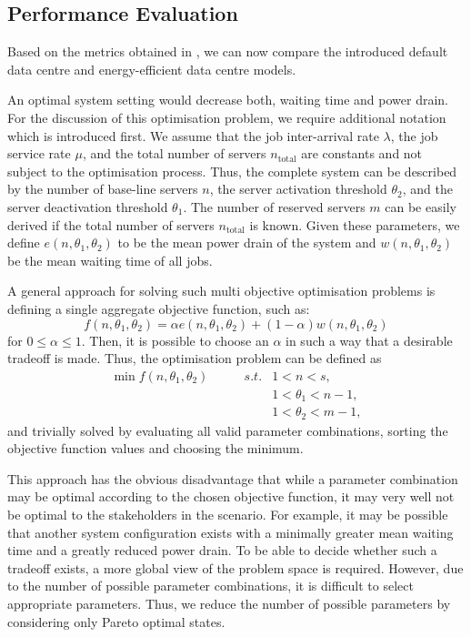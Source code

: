 \subsection{Performance Evaluation}\label{sec:cloud:data_centers:performance_evaluation}
Based on the metrics obtained in , we can now compare the introduced default data centre and energy-efficient data centre models.

An optimal system setting would decrease both, waiting time and power drain.
For the discussion of this optimisation problem, we require additional notation which is introduced first.
We assume that the job inter-arrival rate \(\lambda\), the job service rate \(\mu\), and the total number of servers \(n_\text{total}\) are constants and not subject to the optimisation process.
Thus, the complete system can be described by the number of base-line servers \(n\), the server activation threshold \(\theta_2\), and the server deactivation threshold \(\theta_1\).
The number of reserved servers \(m\) can be easily derived if the total number of servers \(n_\text{total}\) is known.
Given these parameters, we define \(e(n, \theta_1, \theta_2)\) to be the mean power drain of the system and \(w(n, \theta_1, \theta_2)\) be the mean waiting time of all jobs.

A general approach for solving such multi objective optimisation problems is defining a single aggregate objective function, such as:
\begin{equation}
f(n, \theta_1, \theta_2) = \alpha e(n, \theta_1, \theta_2)  + (1-\alpha) w(n, \theta_1, \theta_2)
\end{equation}
for \(0\leq\alpha\leq 1\).
Then, it is possible to choose an \(\alpha\) in such a way that a desirable tradeoff is made. Thus, the optimisation problem can be defined as
\begin{align}
\min f(n, \theta_1, \theta_2) \qquad&s.t.& 1 < n < s,\\ 
&&1 < \theta_1 < n - 1,\nonumber\\
&&1 < \theta_2 < m - 1\nonumber,
\end{align}
and trivially solved by evaluating all valid parameter combinations, sorting the objective function values and choosing the minimum.

This approach has the obvious disadvantage that while a parameter combination may be optimal according to the chosen objective function, it may very well not be optimal to the stakeholders in the scenario.
For example, it may be possible that another system configuration exists with a minimally greater mean waiting time and a greatly reduced power drain.
To be able to decide whether such a tradeoff exists, a more global view of the problem space is required.
However, due to the number of possible parameter combinations, it is difficult to select appropriate parameters.
Thus, we reduce the number of possible parameters by considering only Pareto optimal states.

